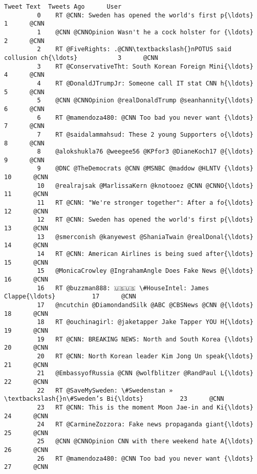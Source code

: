 \documentclass[11pt]{article}
\begin{document}
\begin{Verbatim}[commandchars=\\\{\}]
                                                     Tweet Text  Tweets Ago      User  
         0    RT @CNN: Sweden has opened the world's first p{\ldots}           1      @CNN  
         1    @CNN @CNNOpinion Wasn't he a cock holster for {\ldots}           2      @CNN  
         2    RT @FiveRights: .@CNN\textbackslash{}nPOTUS said collusion ch{\ldots}           3      @CNN  
         3    RT @ConservativeTht: South Korean Foreign Mini{\ldots}           4      @CNN  
         4    RT @DonaldJTrumpJr: Someone call IT stat CNN h{\ldots}           5      @CNN  
         5    @CNN @CNNOpinion @realDonaldTrump @seanhannity{\ldots}           6      @CNN  
         6    RT @mamendoza480: @CNN Too bad you never want {\ldots}           7      @CNN  
         7    RT @saidalammahsud: These 2 young Supporters o{\ldots}           8      @CNN  
         8    @alokshukla76 @weegee56 @KPfor3 @DianeKoch17 @{\ldots}           9      @CNN  
         9    @DNC @TheDemocrats @CNN @MSNBC @maddow @HLNTV {\ldots}          10      @CNN  
         10   @realrajsak @MarlissaKern @knotooez @CNN @CNNO{\ldots}          11      @CNN  
         11   RT @CNN: "We're stronger together": After a fo{\ldots}          12      @CNN  
         12   RT @CNN: Sweden has opened the world's first p{\ldots}          13      @CNN  
         13   @smerconish @kanyewest @ShaniaTwain @realDonal{\ldots}          14      @CNN  
         14   RT @CNN: American Airlines is being sued after{\ldots}          15      @CNN  
         15   @MonicaCrowley @IngrahamAngle Does Fake News @{\ldots}          16      @CNN  
         16   RT @buzzman888: 🇺🇸🇺🇸 \#HouseIntel: James Clappe{\ldots}          17      @CNN  
         17   @ncutchin @DiamondandSilk @ABC @CBSNews @CNN @{\ldots}          18      @CNN  
         18   RT @ouchinagirl: @jaketapper Jake Tapper YOU H{\ldots}          19      @CNN  
         19   RT @CNN: BREAKING NEWS: North and South Korea {\ldots}          20      @CNN  
         20   RT @CNN: North Korean leader Kim Jong Un speak{\ldots}          21      @CNN  
         21   @EmbassyofRussia @CNN @wolfblitzer @RandPaul L{\ldots}          22      @CNN  
         22   RT @SaveMySweden: \#Swedenstan » \textbackslash{}n\#Sweden’s Bi{\ldots}          23      @CNN  
         23   RT @CNN: This is the moment Moon Jae-in and Ki{\ldots}          24      @CNN  
         24   RT @CarmineZozzora: Fake news propaganda giant{\ldots}          25      @CNN  
         25   @CNN @CNNOpinion CNN with there weekend hate A{\ldots}          26      @CNN  
         26   RT @mamendoza480: @CNN Too bad you never want {\ldots}          27      @CNN  

\end{Verbatim}
\end{document}
